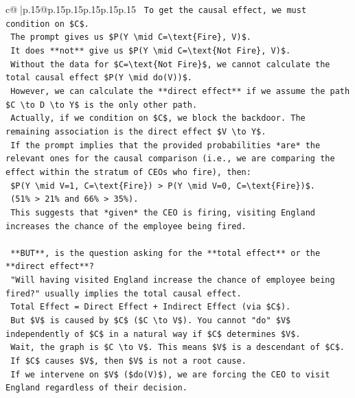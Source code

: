 \documentclass{article}
\begin{document}
{\begin{supertabular}{c@{$\;$}|p{.15\linewidth}@{}p{.15\linewidth}p{.15\linewidth}p{.15\linewidth}p{.15\linewidth}p{.15\linewidth}}
{{{\texttt{    To get the causal effect, we must condition on \$C\$.} \\
\texttt{    The prompt gives us \$P(Y \textbackslash{}mid C=\textbackslash{}text\{Fire\}, V)\$.} \\
\texttt{    It does **not** give us \$P(Y \textbackslash{}mid C=\textbackslash{}text\{Not Fire\}, V)\$.} \\
\texttt{    Without the data for \$C=\textbackslash{}text\{Not Fire\}\$, we cannot calculate the total causal effect \$P(Y \textbackslash{}mid do(V))\$.} \\
\texttt{    However, we can calculate the **direct effect** if we assume the path \$C \textbackslash{}to D \textbackslash{}to Y\$ is the only other path.} \\
\texttt{    Actually, if we condition on \$C\$, we block the backdoor. The remaining association is the direct effect \$V \textbackslash{}to Y\$.} \\
\texttt{    If the prompt implies that the provided probabilities *are* the relevant ones for the causal comparison (i.e., we are comparing the effect within the stratum of CEOs who fire), then:} \\
\texttt{    \$P(Y \textbackslash{}mid V=1, C=\textbackslash{}text\{Fire\}) > P(Y \textbackslash{}mid V=0, C=\textbackslash{}text\{Fire\})\$.} \\
\texttt{    (51\% > 21\% and 66\% > 35\%).} \\
\texttt{    This suggests that *given* the CEO is firing, visiting England increases the chance of the employee being fired.} \\
\\ 
\texttt{    **BUT**, is the question asking for the **total effect** or the **direct effect**?} \\
\texttt{    "Will having visited England increase the chance of employee being fired?" usually implies the total causal effect.} \\
\texttt{    Total Effect = Direct Effect + Indirect Effect (via \$C\$).} \\
\texttt{    But \$V\$ is caused by \$C\$ (\$C \textbackslash{}to V\$). You cannot "do" \$V\$ independently of \$C\$ in a natural way if \$C\$ determines \$V\$.} \\
\texttt{    Wait, the graph is \$C \textbackslash{}to V\$. This means \$V\$ is a descendant of \$C\$.} \\
\texttt{    If \$C\$ causes \$V\$, then \$V\$ is not a root cause.} \\
\texttt{    If we intervene on \$V\$ (\$do(V)\$), we are forcing the CEO to visit England regardless of their decision.} \\
}}}
\end{supertabular}}
\end{document}
